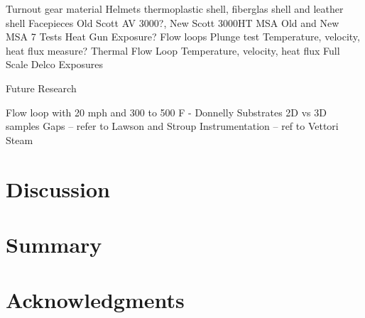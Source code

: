 \documentclass[12pt,oneside]{book}
\begin{document}
Turnout gear material
Helmets    thermoplastic shell, fiberglas shell and leather shell
Facepieces
Old Scott AV 3000?,  New Scott 3000HT
MSA Old  and New MSA 7
Tests
Heat Gun Exposure?
Flow loops
	Plunge test
		Temperature, velocity, heat flux measure?
	Thermal Flow Loop
		Temperature, velocity, heat flux
Full Scale
	Delco Exposures


Future Research

Flow loop    with 20 mph and 300 to 500 F - Donnelly
Substrates
2D vs 3D samples
Gaps – refer to Lawson and Stroup
Instrumentation – ref to Vettori
Steam


\chapter{Discussion}

\chapter{Summary}

\chapter{Acknowledgments}



\appendix
\end{document}

